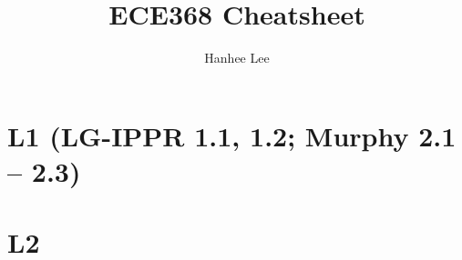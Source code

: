 \documentclass[twoside]{article}
\title{ECE368 Cheatsheet}
\author{Hanhee Lee}
\begin{document}
\maketitle

\tableofcontents

\begin{definition}
    
\end{definition}

\begin{process}

\end{process}

\begin{motivation}

\end{motivation}

\begin{derivation}

\end{derivation}

\begin{warning}

\end{warning}

\begin{summary}

\end{summary}

\begin{algo}

\end{algo}

\begin{example}
    
\end{example}

\begin{faq}

\end{faq}

\section{L1 (LG-IPPR 1.1, 1.2; Murphy 2.1 – 2.3)}

\cleardoublepage

\section{L2} 
\cleardoublepage
\end{document}
